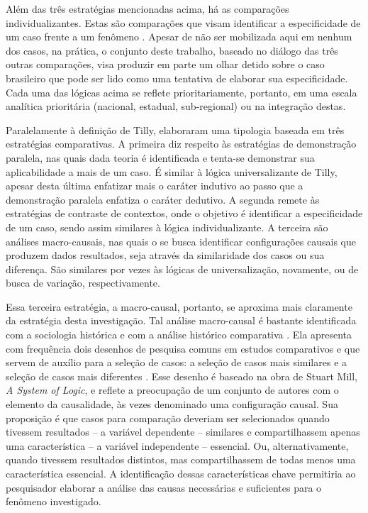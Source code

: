 Além das três estratégias mencionadas acima, há as comparações
individualizantes. Estas são comparações que visam identificar a
especificidade de um caso frente a um fenômeno
\citep[p.~83]{tilly_big_1984}. Apesar de não ser mobilizada aqui em
nenhum dos casos, na prática, o conjunto deste trabalho, baseado no
diálogo das três outras comparações, visa produzir em parte um olhar
detido sobre o caso brasileiro que pode ser lido como uma tentativa de
elaborar sua especificidade. Cada uma das lógicas acima se reflete
prioritariamente, portanto, em uma escala analítica prioritária
(nacional, estadual, sub-regional) ou na integração destas.

Paralelamente à definição de Tilly, \citet{skocpol_uses_1980}
elaboraram uma tipologia baseada em três estratégias comparativas. A
primeira diz respeito às estratégias de demonstração paralela, nas
quais dada teoria é identificada e tenta-se demonstrar sua
aplicabilidade a mais de um caso. É similar à lógica universalizante de
Tilly, apesar desta última enfatizar mais o caráter indutivo ao passo
que a demonstração paralela enfatiza o caráter dedutivo. A segunda
remete às estratégias de contraste de contextos, onde o objetivo é
identificar a especificidade de um caso, sendo assim similares à lógica
individualizante. A terceira são análises macro-causais, nas quais o se
busca identificar configurações causais que produzem dados resultados,
seja através da similaridade dos casos ou sua diferença. São similares
por vezes às lógicas de universalização, novamente, ou de busca de
variação, respectivamente.

Essa terceira estratégia, a macro-causal, portanto, se aproxima mais
claramente da estratégia desta investigação. Tal análise macro-causal é
bastante identificada com a sociologia histórica  e com a análise histórico comparativa
\citep{mahoney_comparative_2003-1}. Ela apresenta com frequência dois
desenhos de pesquisa comuns em estudos comparativos e que servem de
auxílio para a seleção de casos: a seleção de casos mais similares e a
seleção de casos mais diferentes \citep{skocpol_uses_1980}. Esse desenho
é baseado na obra de Stuart Mill, \emph{A System of Logic}, e reflete a
preocupação de um conjunto de autores com o elemento da causalidade, às
vezes denominado uma configuração causal. Sua proposição é que casos
para comparação deveriam ser selecionados quando tivessem resultados --
a variável dependente -- similares e compartilhassem apenas uma
característica -- a variável independente -- essencial. Ou,
alternativamente, quando tivessem resultados distintos, mas
compartilhassem de todas menos uma característica essencial. A
identificação dessas características chave permitiria ao pesquisador
elaborar a análise das causas necessárias e suficientes para o fenômeno
investigado.

